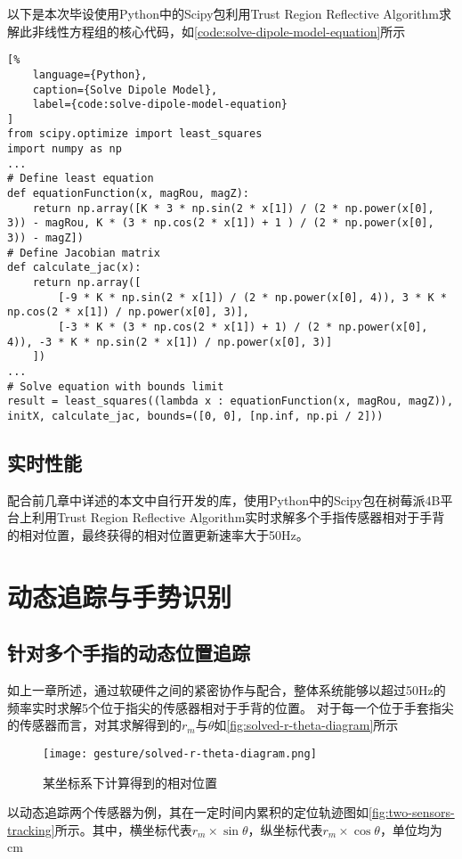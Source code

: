 以下是本次毕设使用Python中的Scipy包利用Trust Region Reflective Algorithm求解此非线性方程组的核心代码，如\autoref{code:solve-dipole-model-equation}所示
\begin{lstlisting}[%
    language={Python},
    caption={Solve Dipole Model},
    label={code:solve-dipole-model-equation}
]
from scipy.optimize import least_squares
import numpy as np
...
# Define least equation
def equationFunction(x, magRou, magZ):
    return np.array([K * 3 * np.sin(2 * x[1]) / (2 * np.power(x[0], 3)) - magRou, K * (3 * np.cos(2 * x[1]) + 1 ) / (2 * np.power(x[0], 3)) - magZ])
# Define Jacobian matrix
def calculate_jac(x):
    return np.array([
        [-9 * K * np.sin(2 * x[1]) / (2 * np.power(x[0], 4)), 3 * K * np.cos(2 * x[1]) / np.power(x[0], 3)],
        [-3 * K * (3 * np.cos(2 * x[1]) + 1) / (2 * np.power(x[0], 4)), -3 * K * np.sin(2 * x[1]) / np.power(x[0], 3)]
    ])
...
# Solve equation with bounds limit
result = least_squares((lambda x : equationFunction(x, magRou, magZ)), initX, calculate_jac, bounds=([0, 0], [np.inf, np.pi / 2]))
\end{lstlisting}

\subsection{实时性能}
配合前几章中详述的本文中自行开发的库，使用Python中的Scipy包在树莓派4B平台上利用Trust Region Reflective Algorithm实时求解多个手指传感器相对于手背的相对位置，最终获得的相对位置更新速率大于50Hz。

\cleardoublepage
\section{动态追踪与手势识别}
\subsection{针对多个手指的动态位置追踪}
如上一章所述，通过软硬件之间的紧密协作与配合，整体系统能够以超过50Hz的频率实时求解5个位于指尖的传感器相对于手背的位置。
对于每一个位于手套指尖的传感器而言，对其求解得到的$r_m$与$\theta$如\autoref{fig:solved-r-theta-diagram}所示

\begin{figure}[H]
    \centering
    \texttt{[image: gesture/solved-r-theta-diagram.png]}
    \caption{\label{fig:solved-r-theta-diagram}某坐标系下计算得到的相对位置}
\end{figure}

以动态追踪两个传感器为例，其在一定时间内累积的定位轨迹图如\autoref{fig:two-sensors-tracking}所示。其中，横坐标代表$r_m \times \sin{\theta}$，纵坐标代表$r_m \times \cos{\theta}$，单位均为cm

